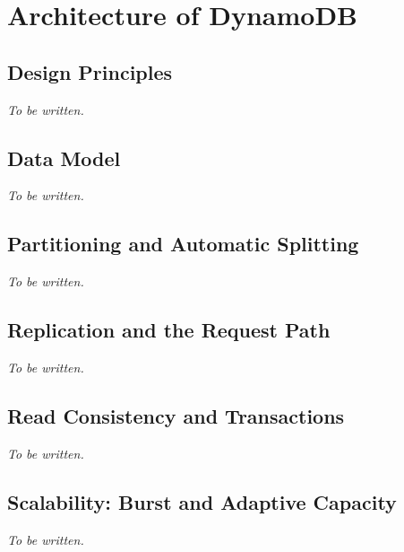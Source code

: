 
\section{Architecture of DynamoDB}\label{sec:architecture}

\subsection{Design Principles}

\textit{To be written.}

\subsection{Data Model}

\textit{To be written.}

\subsection{Partitioning and Automatic Splitting}

\textit{To be written.}

\subsection{Replication and the Request Path}

\textit{To be written.}

\subsection{Read Consistency and Transactions}

\textit{To be written.}

\subsection{Scalability: Burst and Adaptive Capacity}

\textit{To be written.}
